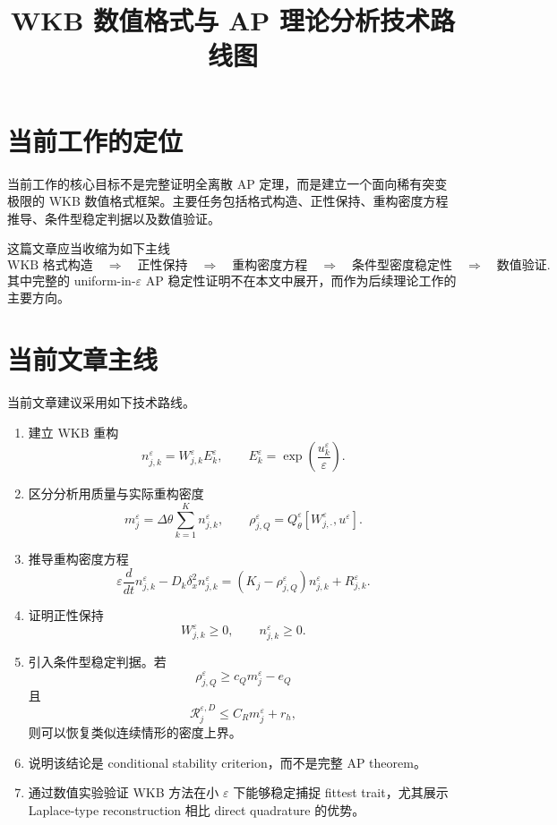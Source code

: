 \documentclass[11pt,a4paper]{ctexart}
\title{WKB 数值格式与 AP 理论分析技术路线图}
\author{}
\date{}
\begin{document}
\maketitle

\section{当前工作的定位}

当前工作的核心目标不是完整证明全离散 AP 定理，而是建立一个面向稀有突变极限的 WKB 数值格式框架。主要任务包括格式构造、正性保持、重构密度方程推导、条件型稳定判据以及数值验证。

这篇文章应当收缩为如下主线
\[
\text{WKB 格式构造}
\quad\Longrightarrow\quad
\text{正性保持}
\quad\Longrightarrow\quad
\text{重构密度方程}
\quad\Longrightarrow\quad
\text{条件型密度稳定性}
\quad\Longrightarrow\quad
\text{数值验证}.
\]
其中完整的 uniform-in-\(\varepsilon\) AP 稳定性证明不在本文中展开，而作为后续理论工作的主要方向。

\section{当前文章主线}

当前文章建议采用如下技术路线。

\begin{enumerate}
\item 建立 WKB 重构
\[
    n_{j,k}^\varepsilon
    =
    W_{j,k}^\varepsilon
    E_k^\varepsilon,
    \qquad
    E_k^\varepsilon
    =
    \exp\left(\frac{u_k^\varepsilon}{\varepsilon}\right).
\]

\item 区分分析用质量与实际重构密度
\[
    m_j^\varepsilon
    =
    \Delta\theta
    \sum_{k=1}^K
    n_{j,k}^\varepsilon,
    \qquad
    \rho_{j,Q}^\varepsilon
    =
    Q_\theta^\varepsilon[W_{j,\cdot}^\varepsilon,u^\varepsilon].
\]

\item 推导重构密度方程
\[
    \varepsilon \frac{d}{dt} n_{j,k}^\varepsilon
    -
    D_k \delta_x^2 n_{j,k}^\varepsilon
    =
    (K_j-\rho_{j,Q}^\varepsilon)n_{j,k}^\varepsilon
    +
    R_{j,k}^\varepsilon.
\]

\item 证明正性保持
\[
    W_{j,k}^\varepsilon\ge0,
    \qquad
    n_{j,k}^\varepsilon\ge0.
\]

\item 引入条件型稳定判据。若
\[
    \rho_{j,Q}^\varepsilon
    \ge
    c_Q m_j^\varepsilon-e_Q
\]
且
\[
    \mathcal R_j^{\varepsilon,D}
    \le
    C_R m_j^\varepsilon+r_h,
\]
则可以恢复类似连续情形的密度上界。

\item 说明该结论是 conditional stability criterion，而不是完整 AP theorem。

\item 通过数值实验验证 WKB 方法在小 \(\varepsilon\) 下能够稳定捕捉 fittest trait，尤其展示 Laplace-type reconstruction 相比 direct quadrature 的优势。
\end{enumerate}
\end{document}

